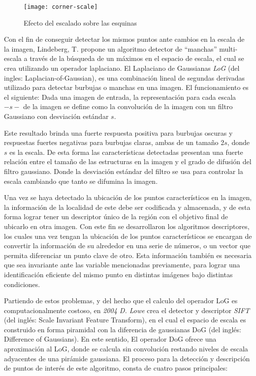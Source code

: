 \begin{figure}[H]
	\centering
	\texttt{[image: corner-scale]}
	\caption[Efecto del escalado sobre las esquinas]{Efecto del escalado sobre las esquinas	\protect\footnotemark}
	\label{imagen:corner-scale}
\end{figure}

Con el fin de conseguir detectar los mismos puntos ante cambios en la escala de la imagen, Lindeberg, T. \cite{log} propone un algoritmo detector de ``manchas'' multi-escala a través de la búsqueda de un máximos en el espacio de escala, el cual se crea utilizando un operador laplaciano. El Laplaciano de Gaussianas \textit{LoG} (del ingles: Laplacian-of-Gaussian), es una combinación lineal de segundas derivadas utilizado para detectar burbujas o manchas en una imagen. El funcionamiento es el siguiente: Dada una imagen de entrada, la representación para cada escala $-s-$ de la imagen se define como la convolución de la imagen con un filtro Gaussiano con desviación estándar $s$.

Este resultado brinda una fuerte respuesta positiva para burbujas oscuras y respuestas fuertes negativas para burbujas claras, ambas de un tamaño 2$s$, donde $s$ es la escala. De esta forma las características detectadas presentan una fuerte relación entre el tamaño de las estructuras en la imagen y el grado de difusión del filtro gaussiano. Donde la desviación estándar del filtro se usa para controlar la escala cambiando que tanto se difumina la imagen.

Una vez se haya detectado la ubicación de los puntos característicos en la imagen, la información de la localidad de este debe ser codificada y almacenada, y de esta forma lograr tener un descriptor único de la región con el objetivo final de ubicarlo en otra imagen. Con este fin se desarrollaron los algoritmos descriptores, los cuales una vez tengan la ubicación de los puntos característicos se encargan de convertir la información de su alrededor en una serie de números, o un vector que permita diferenciar un punto clave de otro. Esta información también es necesaria que sea invariante ante las variable mencionadas previamente, para lograr una identificación eficiente del mismo punto en distintas imágenes bajo distintas condiciones.

Partiendo de estos problemas, y del hecho que el calculo del operador LoG es computacionalmente costoso, en \textit{2004 D. Lowe} crea el detector y descriptor \textit{SIFT} \cite{sift} (del inglés: Scale Invariant Feature Transform), en el cual el espacio de escala es construido en forma piramidal con la diferencia de gaussianas DoG (del inglés: Difference of Gaussians). En este sentido, El operador DoG ofrece una aproximación al LoG, donde se calcula sin convolución restando niveles de escala adyacentes de una pirámide gaussiana. El proceso para la detección y descripción de puntos de interés de este algoritmo, consta de cuatro pasos principales:

